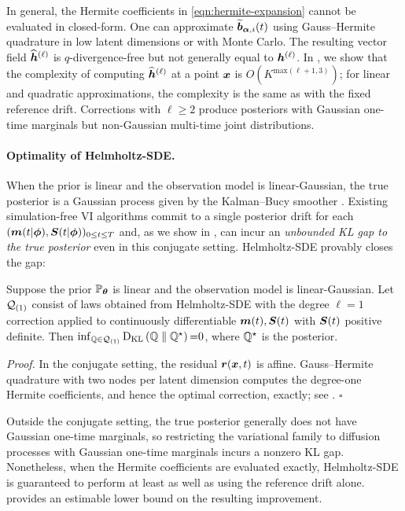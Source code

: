 In general, the Hermite coefficients in \cref{eqn:hermite-expansion} cannot be evaluated in closed-form. 
One can approximate $\widetilde{\boldsymbol{b}}_{\boldsymbol{\alpha},i}(t)$ using Gauss--Hermite quadrature in low latent dimensions or with Monte Carlo.
The resulting vector field $\widehat{\boldsymbol{h}}^{(\ell)}$ is $q$-divergence-free but not generally equal to $\boldsymbol{h}^{(\ell)}$.
In , we show that the complexity of computing $\widehat{\boldsymbol{h}}^{(\ell)}$ at a point $\boldsymbol{x}$ is $O(K^{\mathrm{max}(\ell + 1, 3)})$; for linear and quadratic approximations, the complexity is the same as with the fixed reference drift.
Corrections with $\ell \geq 2$ produce posteriors with Gaussian one-time marginals but non-Gaussian multi-time joint distributions.

\paragraph{Optimality of Helmholtz-SDE.}
When the prior is linear and the observation model is linear-Gaussian, the true posterior is a Gaussian process given by the Kalman--Bucy smoother \cite{kalman1961new}. 
Existing simulation-free VI algorithms commit to a single posterior drift for each $(\boldsymbol{m}(t | \boldsymbol{\phi}), \boldsymbol{S}(t | \boldsymbol{\phi}))_{0 \leq t \leq T}$ and, as we show in , can incur an \emph{unbounded KL gap to the true posterior} even in this conjugate setting.
Helmholtz-SDE provably closes the gap:
\begin{theorem}\label{thm:helm-optimal}
   Suppose the prior $\mathbb{P}_{\boldsymbol{\theta}}$ is linear and the observation model is linear-Gaussian.
   Let $\mathcal{Q}_{(1)}$ consist of  laws obtained from Helmholtz-SDE with the degree $\ell{=}1$ correction applied to continuously differentiable  $\boldsymbol{m}(t),\boldsymbol{S}(t)$ with  $\boldsymbol{S}(t)$ positive definite.
   Then $\inf_{\mathbb{Q}\in\mathcal{Q}_{(1)}}\textrm{D}_{\textrm{KL}}\left(\mathbb{Q}\;\|\;\mathbb{Q}^\star\right){=}0$, where $\mathbb{Q}^\star$ is the posterior.
\end{theorem}
\noindent\emph{Proof.}
In the conjugate setting, the residual $\boldsymbol{r}(\boldsymbol{x}, t)$ is affine. Gauss–Hermite quadrature with two nodes per latent dimension computes the degree-one Hermite coefficients, and hence the optimal correction, exactly; see . \hfill$\square$

Outside the conjugate setting, the true posterior generally does not have Gaussian one-time marginals, so restricting the variational family to diffusion processes with Gaussian one-time marginals incurs a nonzero KL gap.
Nonetheless, when the Hermite coefficients are evaluated exactly, Helmholtz-SDE is guaranteed to perform at least as well as using the reference drift alone.
 provides an estimable lower bound on the resulting improvement.
